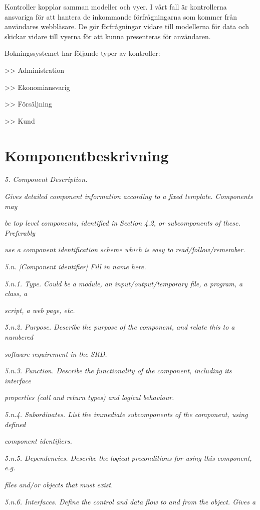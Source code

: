 \documentclass[a4paper, twoside, 11pt, titlepage]{article}
\begin{document}
		Kontroller kopplar samman modeller och vyer. I vårt fall är kontrollerna ansvariga för att hantera de inkommande förfrågningarna som kommer från användares webbläsare. De gör förfrågningar vidare till modellerna för data och skickar vidare till vyerna för att kunna presenteras för användaren.

		Bokningssystemet har följande typer av kontroller:

		>> Administration

		>> Ekonomiansvarig

		>> Försäljning

		>> Kund

\clearpage
\section{Komponentbeskrivning}


\emph{5. Component Description.}

\emph{Gives detailed component information according to a fixed template. Components may}

\emph{be top level components, identified in Section 4.2, or subcomponents of these. Preferably}

\emph{use a component identification scheme which is easy to read/follow/remember.}

\emph{5.n. [Component identifier] Fill in name here.}

\emph{5.n.1. Type. Could be a module, an input/output/temporary file, a program, a class, a}

\emph{script, a web page, etc.}

\emph{5.n.2. Purpose. Describe the purpose of the component, and relate this to a numbered}

\emph{software requirement in the SRD.}

\emph{5.n.3. Function. Describe the functionality of the component, including its interface}

\emph{properties (call and return types) and logical behaviour.}

\emph{5.n.4. Subordinates. List the immediate subcomponents of the component, using defined}

\emph{component identifiers.}

\emph{5.n.5. Dependencies. Describe the logical preconditions for using this component, e.g.}

\emph{files and/or objects that must exist.}

\emph{5.n.6. Interfaces. Define the control and data flow to and from the object. Gives a}
\end{document}
